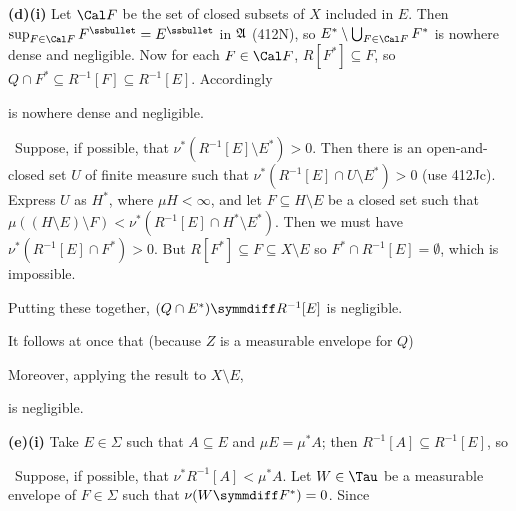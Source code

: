 {\medskip

{\bf (d)(i)} Let $\Cal F$ be the set of closed subsets of $X$ included
in $E$.   Then $\sup_{F\in\Cal F}F^{\ssbullet}=E^{\ssbullet}$ in
$\frak A$ (412N), so $E^*\setminus\bigcup_{F\in\Cal F}F^*$ is nowhere
dense and negligible.   Now for each $F\in\Cal F$, $R[F^*]\subseteq F$,
so $Q\cap F^*\subseteq R^{-1}[F]\subseteq R^{-1}[E]$.   Accordingly


\noindent is nowhere dense and negligible.

\medskip

 \Quer\ Suppose, if
possible, that $\nu^*(R^{-1}[E]\setminus E^*)>0$.   Then there is an
open-and-closed set $U$ of finite measure such that
$\nu^*(R^{-1}[E]\cap U\setminus E^*)>0$ (use 412Jc).   Express
$U$ as $H^*$, where $\mu H<\infty$, and let $F\subseteq H\setminus E$ be
a closed set such that
$\mu((H\setminus E)\setminus F)<\nu^*(R^{-1}[E]\cap H^*\setminus E^*)$.
Then we must have $\nu^*(R^{-1}[E]\cap F^*)>0$.
But $R[F^*]\subseteq F\subseteq X\setminus E$ so
$F^*\cap R^{-1}[E]=\emptyset$,
which is impossible.\ \BanG\

\medskip

 Putting these together,
$(Q\cap E^*)\symmdiff R^{-1}[E]$ is negligible.

\medskip

 It follows at
once that (because $Z$ is a measurable envelope for $Q$)


\noindent Moreover, applying the result to $X\setminus E$,


\noindent is negligible.

\medskip

{\bf (e)(i)} Take $E\in\Sigma$ such that $A\subseteq E$ and
$\mu E=\mu^*A$;  then $R^{-1}[A]\subseteq R^{-1}[E]$, so


\medskip

 \Quer\ Suppose, if possible, that
$\nu^*R^{-1}[A]<\mu^*A$.   Let $W\in\Tau$ be a measurable envelope of
$F\in\Sigma$ such that $\nu(W\symmdiff F^*)=0$.   Since

}
